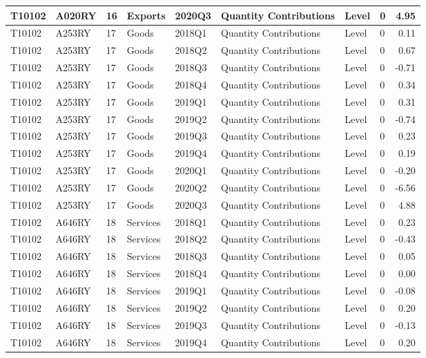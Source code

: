\documentclass[
]{article}
\begin{document}
\begin{tabular}{l|l|l|l|l|l|l|l|r}
\hline
T10102 & A020RY & 16 & Exports & 2020Q3 & Quantity Contributions & Level & 0 & 4.95\\
\hline
T10102 & A253RY & 17 & Goods & 2018Q1 & Quantity Contributions & Level & 0 & 0.11\\
\hline
T10102 & A253RY & 17 & Goods & 2018Q2 & Quantity Contributions & Level & 0 & 0.67\\
\hline
T10102 & A253RY & 17 & Goods & 2018Q3 & Quantity Contributions & Level & 0 & -0.71\\
\hline
T10102 & A253RY & 17 & Goods & 2018Q4 & Quantity Contributions & Level & 0 & 0.34\\
\hline
T10102 & A253RY & 17 & Goods & 2019Q1 & Quantity Contributions & Level & 0 & 0.31\\
\hline
T10102 & A253RY & 17 & Goods & 2019Q2 & Quantity Contributions & Level & 0 & -0.74\\
\hline
T10102 & A253RY & 17 & Goods & 2019Q3 & Quantity Contributions & Level & 0 & 0.23\\
\hline
T10102 & A253RY & 17 & Goods & 2019Q4 & Quantity Contributions & Level & 0 & 0.19\\
\hline
T10102 & A253RY & 17 & Goods & 2020Q1 & Quantity Contributions & Level & 0 & -0.20\\
\hline
T10102 & A253RY & 17 & Goods & 2020Q2 & Quantity Contributions & Level & 0 & -6.56\\
\hline
T10102 & A253RY & 17 & Goods & 2020Q3 & Quantity Contributions & Level & 0 & 4.88\\
\hline
T10102 & A646RY & 18 & Services & 2018Q1 & Quantity Contributions & Level & 0 & 0.23\\
\hline
T10102 & A646RY & 18 & Services & 2018Q2 & Quantity Contributions & Level & 0 & -0.43\\
\hline
T10102 & A646RY & 18 & Services & 2018Q3 & Quantity Contributions & Level & 0 & 0.05\\
\hline
T10102 & A646RY & 18 & Services & 2018Q4 & Quantity Contributions & Level & 0 & 0.00\\
\hline
T10102 & A646RY & 18 & Services & 2019Q1 & Quantity Contributions & Level & 0 & -0.08\\
\hline
T10102 & A646RY & 18 & Services & 2019Q2 & Quantity Contributions & Level & 0 & 0.20\\
\hline
T10102 & A646RY & 18 & Services & 2019Q3 & Quantity Contributions & Level & 0 & -0.13\\
\hline
T10102 & A646RY & 18 & Services & 2019Q4 & Quantity Contributions & Level & 0 & 0.20\\

\end{tabular}
\end{document}
